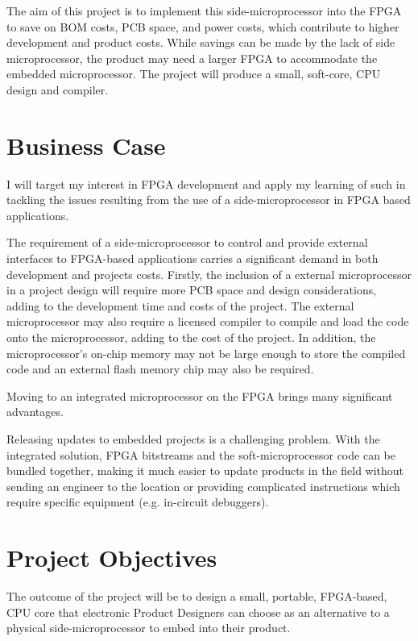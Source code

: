 \documentclass[11pt,a4paper]{article}
\begin{document}
The aim of this project is to implement this side-microprocessor into the FPGA to save on BOM costs, PCB space, and power costs, which contribute to higher development and product costs. While savings can be made by the lack of side microprocessor, the product may need a larger FPGA to accommodate the embedded microprocessor. The project will produce a small, soft-core, CPU design and compiler.

\section{Business Case}
I will target my interest in FPGA development and apply my learning of such in tackling the issues resulting from the use of a side-microprocessor in FPGA based applications.

The requirement of a side-microprocessor to control and provide external interfaces to FPGA-based applications carries a significant demand in both development and projects costs. Firstly, the inclusion of a external microprocessor in a project design will require more PCB space and design considerations, adding to the development time and costs of the project. The external microprocessor may also require a licensed compiler to compile and load the code onto the microprocessor, adding to the cost of the project. In addition, the  microprocessor's on-chip memory may not be large enough to store the compiled code and an external flash memory chip may also be required.

Moving to an integrated microprocessor on the FPGA brings many significant advantages.

Releasing updates to embedded projects is a challenging problem. With the integrated solution, FPGA bitstreams and the soft-microprocessor code can be bundled together, making it much easier to update products in the field without sending an engineer to the location or providing complicated instructions which require specific equipment (e.g. in-circuit debuggers).


\section{Project Objectives}
The outcome of the project will be to design a small, portable, FPGA-based, CPU core that electronic Product Designers can choose as an alternative to a physical side-microprocessor to embed into their product.
\end{document}
